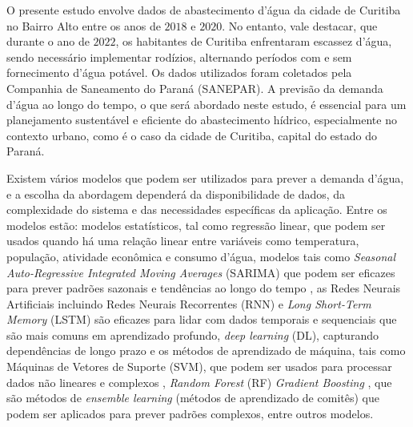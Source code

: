 O presente estudo envolve dados de abastecimento d'água da cidade de Curitiba no Bairro Alto entre os anos de $2018$ e $2020$. No entanto, vale destacar, que durante o ano de $2022$, os habitantes de Curitiba enfrentaram escassez d'água, sendo necessário implementar rodízios, alternando períodos com e sem fornecimento d'água potável. Os dados utilizados foram coletados pela Companhia de Saneamento do Paraná (SANEPAR). A previsão da demanda d'água ao longo do tempo, o que será abordado neste estudo, é essencial para um planejamento sustentável e eficiente do abastecimento hídrico, especialmente no contexto urbano, como é o caso da cidade de Curitiba, capital do estado do Paraná. 

Existem vários modelos que podem ser utilizados para prever a demanda d'água, e a escolha da abordagem dependerá da disponibilidade de dados, da complexidade do sistema e das necessidades específicas da aplicação. Entre os modelos estão: modelos estatísticos, tal como regressão linear, que podem ser usados quando há uma relação linear entre variáveis como temperatura, população, atividade econômica e consumo d'água, modelos tais como \textit{Seasonal Auto-Regressive Integrated Moving Averages} (SARIMA) que podem ser eficazes para prever padrões sazonais e tendências ao longo do tempo \cite{OLIVEIRA2017177}, as Redes Neurais Artificiais incluindo Redes Neurais Recorrentes (RNN) \cite{ASEERI2023101984} e \textit{Long Short-Term Memory} (LSTM) \cite{SABZIPOUR2023130380} são eficazes para lidar com dados temporais e sequenciais que são mais comuns em aprendizado profundo, \textit{deep learning} (DL), capturando dependências de longo prazo e os métodos de aprendizado de máquina, tais como Máquinas de Vetores de Suporte (SVM), que podem ser usados para processar dados não lineares e complexos \cite{CANDELIERI2019202}, \textit{Random Forest} (RF) \cite{ALI2023731} \textit{Gradient Boosting} \cite{DONG2023105579}, que são métodos de \textit{ensemble learning} (métodos de aprendizado de comitês) que podem ser aplicados para prever padrões complexos, entre outros modelos.



